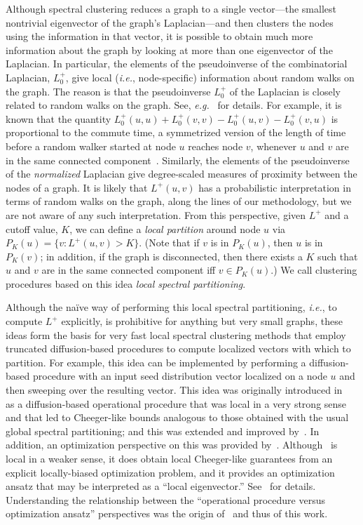 Although spectral clustering reduces a graph to a single vector---the 
smallest nontrivial eigenvector of the graph's Laplacian---and then 
clusters the nodes using the information in that vector, 
it is possible to obtain much more information about the graph by looking 
at more than one eigenvector of the Laplacian.  
In particular, the elements of the pseudoinverse of the combinatorial 
Laplacian, $L_0^{+}$, give local (\emph{i.e.}, node-specific) information 
about random walks on the graph.
The reason is that the pseudoinverse $L_0^+$  of the Laplacian is closely 
related to random walks on the graph.  
See, \emph{e.g.}~\cite{chebotarev1998proximity} for details.  
For example, 
it is known that the
quantity $L_0^{+} (u,u) + L_0^{+} (v,v) - L_0^{+} (u,v) - L_0^{+} (v,u)$ is
proportional to the commute time, a symmetrized version of the length of 
time before a random walker started at node $u$ reaches node $v$, whenever 
$u$ and $v$ are in the same connected component~\cite{chandra1989electrical}.  
Similarly, the elements of the pseudoinverse of the \emph{normalized} 
Laplacian give degree-scaled measures of proximity between the nodes of a 
graph.
It is likely that $L^{+}(u,v)$ has a probabilistic interpretation in terms 
of random walks on the graph, along the lines of our methodology, but we 
are not aware of any such interpretation.
From this perspective, given $L^{+}$ and a cutoff value, $K$, we can 
define a \emph{local partition} around node $u$ via 
$P_K(u) = \{ v : L^{+}(u,v) > K \}$.  
(Note that if $v$ is in $P_K(u)$, then $u$ is in $P_K(v)$; in addition, if 
the graph is disconnected, then there exists a $K$ such that $u$ and $v$ 
are in the same connected component iff $v \in P_K(u)$.)  
We call clustering procedures based on this idea \emph{local spectral 
partitioning}.

Although the na\"{i}ve way of performing this local spectral partitioning, 
\emph{i.e.}, to compute $L^{+}$ explicitly, is prohibitive for anything but 
very small graphs, these ideas form the basis for very fast local spectral 
clustering methods that employ truncated diffusion-based procedures to 
compute localized vectors with which to partition.
For example, this idea can be implemented by performing a diffusion-based 
procedure with an input seed distribution vector localized on a node $u$ and 
then sweeping over the resulting vector.
This idea was originally introduced in~\cite{Spielman:2004} as a 
diffusion-based operational procedure that was local in a very strong sense 
and that led to Cheeger-like bounds analogous to those obtained with the 
usual global spectral partitioning; and this was extended and improved 
by~\cite{andersen06local,Chung07_heatkernelPNAS}.
In addition, an optimization perspective on this was provided 
by~\cite{MOV09_TRv2}.
Although~\cite{MOV09_TRv2} is local in a weaker sense, it does obtain local 
Cheeger-like guarantees from an explicit locally-biased optimization 
problem, and it provides an optimization ansatz that may be interpreted as 
a ``local eigenvector.''
See~\cite{Spielman:2004,andersen06local,Chung07_heatkernelPNAS,MOV09_TRv2} 
for details.
Understanding the relationship between the ``operational procedure versus
optimization ansatz'' perspectives was the origin 
of~\cite{MO11-implementing} and thus of this work.


